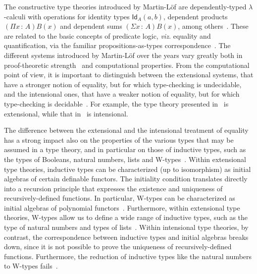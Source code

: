 \documentclass{article}
\newcommand{\Id}{\mathsf{Id}}
\newcommand{\id}[1]{\Id_{#1}}
\theoremstyle{remark}
\theoremstyle{definition}
\begin{document}
\noindent 
The constructive type theories introduced by Martin-L\"of are dependently-typed
$\lambda$-calculi with operations for identity types $\id{A}(a,b)$, dependent products 
$(\Pi x {\, : \,}  A)B(x)$ and dependent sums $(\Sigma x {\, : \,} A)B(x)$,  among others~\cite{MartinLofP:intttp,MartinLofP:conmcp,MartinLofP:inttt,NordstromB:promlt,NordstromB:marltt}.   
These are related to the basic concepts of predicate logic, \emph{viz.}
equality and quantification, via the familiar propositions-as-types correspondence~\cite{HowardWH:foratn}. The different systems introduced by Martin-L\"of over the years 
vary greatly both in proof-theoretic strength~\cite{GrifforE:strsml} and computational
properties. From the computational point of view, it is important to
distinguish between the extensional systems, that have a stronger
notion of equality, but for which type-checking is undecidable, and the intensional ones, that have a
weaker notion of equality, but for which type-checking is decidable~\cite{HofmannM:extcit}. For example, the type theory presented in~\cite{MartinLofP:inttt} is extensional, while that in~\cite{NordstromB:marltt} is 
intensional.

The difference between the extensional and the intensional treatment of equality has a strong 
impact also on the properties of the various types that may be assumed in a type theory, and in particular
on those of inductive types, such as the types of Booleans, natural numbers, lists and W-types~\cite{MartinLofP:conmcp}.  Within extensional type theories, inductive types can be 
characterized (up to isomorphism) as initial algebras of certain definable functors. The initiality condition 
translates directly into a recursion principle that expresses the existence and uniqueness of 
recursively-defined functions. In particular, W-types can be characterized as initial algebras of polynomial functors~\cite{DybjerP:repids,MoerdijkI:weltc}. Furthermore, within extensional type theories, W-types allow us to define a wide range of inductive types, such as the type of natural numbers and types of lists~\cite{DybjerP:repids,GambinoN:weltdp,AbbottM:concsp}.
Within intensional type theories, by contrast, the correspondence between inductive types and initial algebras 
breaks down, since it is not possible to prove the uniqueness of recursively-defined functions. 
Furthermore, the reduction of inductive types like the natural numbers to W-types fails~\cite{DybjerP:repids,GoguenH:inddtw}.
 
\end{document}
